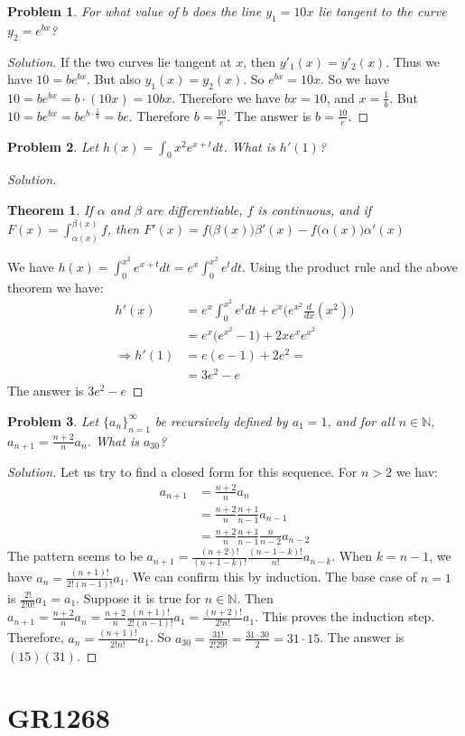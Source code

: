 \documentclass[crop=false,class=book]{standalone}
\theoremstyle{mystyle}
\newtheorem{problem}{Problem}[section]
\newtheorem*{theorem*}{Theorem}
\begin{document}
\begin{problem}
For what value of $b$ does the line $y_1=10x$ lie tangent to the curve $y_2=e^{bx}$?
\end{problem}
\begin{proof}[Solution]
If the two curves lie tangent at $x$, then $y'_1(x) = y'_2(x)$. Thus we have $10 = be^{bx}$. But also $y_1(x) = y_2(x)$. So $e^{bx} = 10x$. So we have $10 = be^{bx} = b\cdot (10x) = 10bx$. Therefore we have $bx = 10$, and $x = \frac{1}{b}$. But $10 = b e^{bx} = b e^{b\cdot \frac{1}{b}} = be$. Therefore $b = \frac{10}{e}$. The answer is $b = \frac{10}{e}$.
\end{proof}
\begin{problem}
Let $h(x)=\int_{0}{x^{2}}e^{x+t}dt$. What is $h'(1)$?
\end{problem}
\begin{proof}[Solution]
\begin{theorem*}
If $\alpha$ and $\beta$ are differentiable, $f$ is continuous, and if $F(x) = \int_{\alpha(x)}^{\beta(x)}f$, then $F'(x) = f\big(\beta(x)\big)\beta'(x) - f\big(\alpha(x)\big)\alpha'(x)$
\end{theorem*}
We have $h(x) = \int_{0}^{x^2}e^{x+t}dt = e^x \int_{0}^{x^2}e^t dt$. Using the product rule and the above theorem we have:
\begin{align*}
    h'(x) &= e^x \int_{0}^{x^2} e^t dt + e^{x} \big(e^{x^2}\frac{d}{dx}(x^2)\big) \\
    &= e^x\big(e^{x^2}-1\big) + 2xe^xe^{x^2} \\
    \Rightarrow h'(1) &= e(e-1) + 2e^2 = \\
    &= 3e^2 - e
\end{align*}
The answer is $3e^{2}-e$
\end{proof}
\begin{problem}
Let $\{a_n\}_{n=1}^{\infty}$ be recursively defined by $a_1 = 1$, and for all $n\in \mathbb{N}$, $a_{n+1} = \frac{n+2}{n}a_n$. What is $a_{30}$?
\end{problem}
\begin{proof}[Solution]
Let us try to find a closed form for this sequence. For $n>2$ we hav:
\begin{align*}
    a_{n+1} &= \frac{n+2}{n}a_n \\
    &= \frac{n+2}{n}\frac{n+1}{n-1}a_{n-1}\\
    &= \frac{n+2}{n}\frac{n+1}{n-1}\frac{n}{n-2}a_{n-2}
\end{align*}
The pattern seems to be $a_{n+1} = \frac{(n+2)!}{(n+1-k)!}\frac{(n-1-k)!}{n!}a_{n-k}$. When $k=n-1$, we have $a_{n} = \frac{(n+1)!}{2!(n-1)!}a_1$. We can confirm this by induction. The base case of $n=1$ is $\frac{2!}{2!0!}a_1 = a_1$. Suppose it is true for $n\in \mathbb{N}$. Then $a_{n+1} = \frac{n+2}{n} a_n = \frac{n+2}{n} \frac{(n+1)!}{2!(n-1)!}a_1 = \frac{(n+2)!}{2!n!}a_1$. This proves the induction step. Therefore, $a_n = \frac{(n+1)!}{2!n!}a_1$. So $a_{30} = \frac{31!}{2!29!} = \frac{31\cdot 30}{2} = 31\cdot 15$. The answer is $(15)(31)$.
\end{proof}
\section{GR1268}
\end{document}
